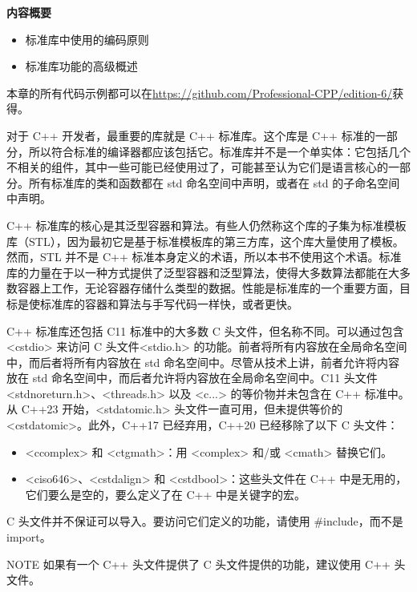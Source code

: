 \noindent
\textbf{内容概要}

\begin{itemize}
\item
标准库中使用的编码原则

\item
标准库功能的高级概述
\end{itemize}

本章的所有代码示例都可以在\url{https://github.com/Professional-CPP/edition-6/}获得。

对于 C++ 开发者，最重要的库就是 C++ 标准库。这个库是 C++ 标准的一部分，所以符合标准的编译器都应该包括它。标准库并不是一个单实体：它包括几个不相关的组件，其中一些可能已经使用过了，可能甚至认为它们是语言核心的一部分。所有标准库的类和函数都在 std 命名空间中声明，或者在 std 的子命名空间中声明。

C++ 标准库的核心是其泛型容器和算法。有些人仍然称这个库的子集为标准模板库（STL），因为最初它是基于标准模板库的第三方库，这个库大量使用了模板。然而，STL 并不是 C++ 标准本身定义的术语，所以本书不使用这个术语。标准库的力量在于以一种方式提供了泛型容器和泛型算法，使得大多数算法都能在大多数容器上工作，无论容器存储什么类型的数据。性能是标准库的一个重要方面，目标是使标准库的容器和算法与手写代码一样快，或者更快。

C++ 标准库还包括 C11 标准中的大多数 C 头文件，但名称不同。可以通过包含 <cstdio> 来访问 C 头文件<stdio.h> 的功能。前者将所有内容放在全局命名空间中，而后者将所有内容放在 std 命名空间中。尽管从技术上讲，前者允许将内容放在 std 命名空间中，而后者允许将内容放在全局命名空间中。C11 头文件 <stdnoreturn.h>、<threads.h> 以及 <c...> 的等价物并未包含在 C++ 标准中。从 C++23 开始，<stdatomic.h> 头文件一直可用，但未提供等价的 <cstdatomic>。此外，C++17 已经弃用，C++20 已经移除了以下 C 头文件：

\begin{itemize}
\item
<ccomplex> 和 <ctgmath>：用 <complex> 和/或 <cmath> 替换它们。

\item
<ciso646>、<cstdalign> 和 <cstdbool>：这些头文件在 C++ 中是无用的，它们要么是空的，要么定义了在 C++ 中是关键字的宏。
\end{itemize}

C 头文件并不保证可以导入。要访问它们定义的功能，请使用 \#include，而不是 import。

\begin{myNotic}{NOTE}
如果有一个 C++ 头文件提供了 C 头文件提供的功能，建议使用 C++ 头文件。
\end{myNotic}

